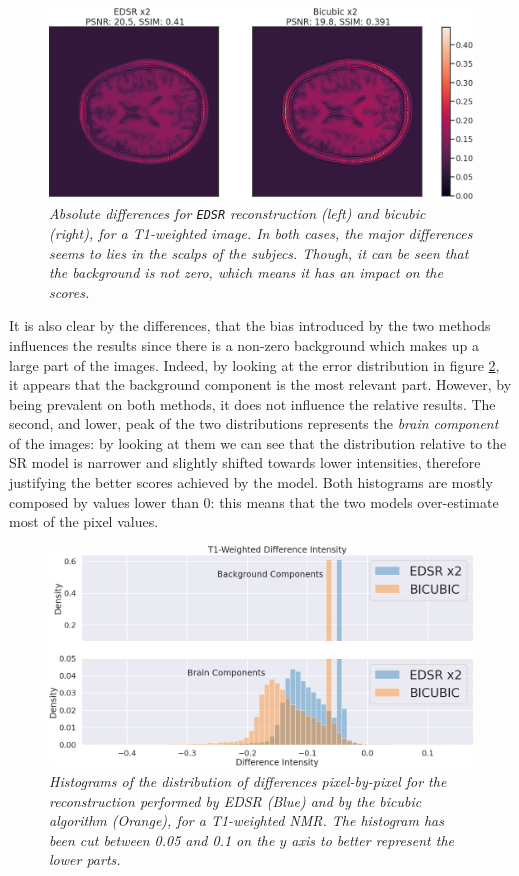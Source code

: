 \documentclass[12pt,a4paper]{report}
\begin{document}
\begin{figure}[H]
 \centering
 \includegraphics[scale=0.4]{./images/diff-edsr.png}
 \caption{\it Absolute differences for {\tt EDSR} reconstruction (left) and bicubic (right), for a T1-weighted image. In both cases, the major differences seems to lies in the scalps of the subjecs. Though, it can be seen that the background is not zero, which means it has an impact on the scores.}
 \label{fig:abs_diff_x2}
\end{figure}

It is also clear by the differences, that the bias introduced by the two methods influences the results since there is a non-zero background which makes up a large part of the images. Indeed, by looking at the error distribution in figure \ref{fig:histo-edsr}, it appears that the background component is the most relevant part. 
However, by being prevalent on both methods, it does not influence the relative results.
The second, and lower, peak of the two distributions represents the {\it brain component} of the images: by looking at them we can see that the distribution relative to the SR model is narrower and slightly shifted towards lower intensities, therefore justifying the better scores achieved by the model.
Both histograms are mostly composed by values lower than 0: this means that the two models over-estimate most of the pixel values.

\begin{figure}[H]
 \centering
 \includegraphics[scale=.35]{./images/EDSR_diff_histo_t1.png}
 \caption{\it Histograms of the distribution of differences pixel-by-pixel for the reconstruction performed by EDSR (Blue) and by the bicubic algorithm (Orange), for a T1-weighted NMR. The histogram has been cut between 0.05 and 0.1 on the $y$ axis to better represent the lower parts.}
 \label{fig:histo-edsr}
\end{figure}
\end{document}
